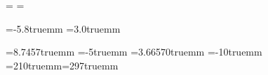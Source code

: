 
\hsize=28pc %
\vsize=40pc %

\newdimen\fullhsize \fullhsize=\hsize
\newdimen\gutter \gutter=2pc
\newdimen\fullvsize \fullvsize=\vsize
\def\fullline{\hbox to\fullhsize}


\ifnum{}
 \hoffset=-10.2mm \voffset=-4.8mm
 \ifx\MTA\undefined\else \pdfpagewidth=148.5mm \pdfpageheight=210mm \fi
\fi
\ifnum{} \hoffset=-5.8truemm \voffset=3.0truemm \fi

\newdimen\leftmargin \leftmargin=15mm
\newdimen\rightmargin \rightmargin=15mm
\newdimen\topmargin \topmargin=16mm
\newdimen\bottommargin \bottommargin=13mm
\ifx\titulo\undefined \let\titulo=\relax \fi
\ifnum{}
 \hoffset=8.7457truemm \voffset=-5truemm
 \ifx\MTA\undefined\else \hoffset=3.66570truemm \voffset=-10truemm
  \pdfpagewidth=210truemm\pdfpageheight=297truemm \fi
 \let\oldshipout=\shipout
 \def\shipout{\futurelet\SomeBox\newshipout}
 \def\newshipout{\ifx\SomeBox\box \let\next\ShipZero \else
  \ifx\SomeBox\copy \let\next\ShipZero \else \let\next\ShipAfterZero \fi\fi
  \afterassignment\next\setbox0=}
 \def\ShipAfterZero{\aftergroup\ShipZero}
 \def\ShipZero{\oldshipout\vbox{\topcrop\box0\bottomcrop}}
 \def\hruletruecm{\hbox to 1truecm{\hrulefill}}
 \def\showcmrule{\hbox to1cm{\vrule height0.25cm depth0.25cm
   \hrulefill\vrule height0.25cm depth0.25cm}}
 \def\topcrop{\fullline{\tenrm
   \llap{\hruletruecm\vrule height 1truecm \kern\leftmargin}%
   \vbox{
    \halign{##\hfil\cr \titulo\cr {\tentt\jobname}\cr}
    \nointerlineskip\kern3pt\null}\hfil
   \vbox{\halign{\hfil##\hfil\cr 1cm\cr \showcmrule\cr}
    \nointerlineskip\kern3pt\null}\hfil
   \vbox{\halign{\hfil##\cr \fourteenbx\folio\cr \timestamp\cr}
    \nointerlineskip\kern3pt\null}%
   \rlap{\kern\rightmargin\vrule height 1truecm\hruletruecm}}%
   \kern\topmargin\nointerlineskip}
 \def\bottomcrop{\nointerlineskip\kern\bottommargin
  \fullline{\llap{\hruletruecm\vrule depth 1truecm\kern\leftmargin}\hfil
   \rlap{\kern\rightmargin\vrule depth 1truecm\hruletruecm}}}
\fi

\def\timestamp{\the\year.%
 \ifnum\month<10 0\fi \the\month.%
 \ifnum\day<10 0\fi\the\day:%
  \count255=\time \divide\count255 by 60
 \ifnum\count255<10 0\fi \the\count255.%
  \multiply\count255 by 60 \advance\count255 by -\time
  \multiply\count255 by -1
 \ifnum\count255<10 0\fi \the\count255}
